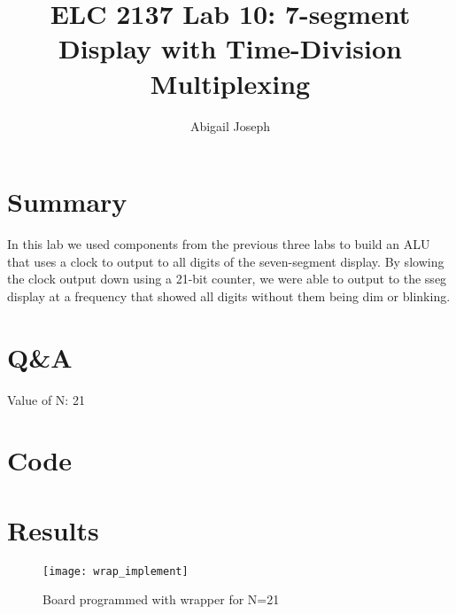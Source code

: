 \documentclass[11pt]{article}
\newcommand{\Verilog}[2][]{%
	
}
\begin{document}
\title{ELC 2137 Lab 10: 7-segment Display with Time-Division
	Multiplexing}
\author{Abigail Joseph}

\maketitle


\section*{Summary}

In this lab we used components from the previous three labs to build an ALU that uses a clock to output to all digits of the seven-segment display. By slowing the clock output down using a 21-bit counter, we were able to output to the sseg display at a frequency that showed all digits without them being dim or blinking.   


\section*{Q\&A}

Value of N: 21

\section*{Code}

\Verilog[firstline=23, caption=Register ,label=code:file_1]{show2c.sv}
\Verilog[firstline=23, caption=Register ,label=code:file_2]{show2c_test.sv}
\Verilog[firstline=23, caption=Register ,label=code:file_3]{ncount.sv}
\Verilog[firstline=23, caption=Register ,label=code:file_4]{ncount_test.sv}
\Verilog[firstline=23, caption=Register ,label=code:file_5]{top_lab10.sv}


\section*{Results}

\begin{figure}[ht]\centering
	\texttt{[image: wrap\_implement]}
	\caption{Board programmed with wrapper for N=21}
	\label{fig:wrap_21}			
\end{figure}
\end{document}
